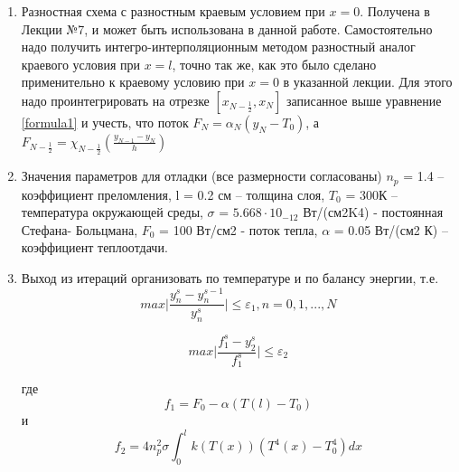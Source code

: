 \begin{enumerate}
\begin{table}[ph!]
\begin{tabular}{|c|c|c|c|c|}
		\end{tabular}
	\end{table}

	\item Разностная схема с разностным краевым условием при $x = 0$. Получена в Лекции №7, и может быть использована в данной работе. Самостоятельно надо получить интегро-интерполяционным методом разностный аналог краевого условия при $x = l$, точно
	так же, как это было сделано применительно к краевому условию при $x = 0$ в указанной 
	лекции. Для этого надо проинтегрировать на отрезке $[x_{N-\frac{1}{2}}, x_N]$ записанное выше уравнение \ref{formula1} и учесть, что поток $F_N = \alpha_N(y_N - T_0)$, а $F_{N - \frac{1}{2}} = \chi_{N - \frac{1}{2}}(\frac{y_{N-1} - y_N}{h})$
	
	\item Значения параметров для отладки (все размерности согласованы)
	$n_p$ = 1.4 – коэффициент преломления,
	l = 0.2 см – толщина слоя,
	$T_0$ = 300К – температура окружающей среды,
	$\sigma$ = $5.668 \cdot 10_{-12}$ Вт/(см2K4) - постоянная Стефана- Больцмана,
	$F_0$ = 100 Вт/см2 - поток тепла,
	$\alpha$ = 0.05 Вт/(см2 К) – коэффициент теплоотдачи. 
	
	\item  Выход из итераций организовать по температуре и по балансу энергии, т.е.
	\begin{equation}\label{formula3}
		max \bigg|\frac{y_n^s - y_n^{s-1}}{y_n^s} \bigg| \leq \varepsilon_1, n = 0, 1, ..., N
	\end{equation}

	\begin{equation}\label{formula4}
		max \bigg|\frac{f_1^s - y_2^s}{f_1^s} \bigg| \leq \varepsilon_2
	\end{equation}
	
	где 
	\begin{equation}\label{formula5}
		f_1 = F_0 - \alpha(T(l) - T_0)
	\end{equation}
	и
	\begin{equation}\label{formula6}
		f_2 = 4n_p^2 \sigma \int_0^l k(T(x))(T^4(x) - T_0^4)dx
	\end{equation}
	
\end{enumerate}





